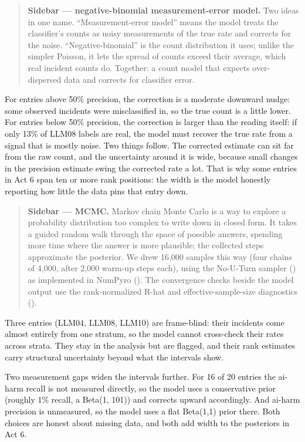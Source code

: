 \documentclass[11pt]{article}
\begin{document}
\begin{quote}
\textbf{Sidebar --- negative-binomial measurement-error model.} Two
ideas in one name. ``Measurement-error model'' means the model treats
the classifier's counts as noisy measurements of the true rate and
corrects for the noise. ``Negative-binomial'' is the count distribution
it uses; unlike the simpler Poisson, it lets the spread of counts exceed
their average, which real incident counts do. Together: a count model
that expects over-dispersed data and corrects for classifier error.
\end{quote}

For entries above 50\% precision, the correction is a moderate downward
nudge: some observed incidents were misclassified in, so the true count
is a little lower. For entries below 50\% precision, the correction is
larger than the reading itself: if only 13\% of LLM08 labels are real,
the model must recover the true rate from a signal that is mostly noise.
Two things follow. The corrected estimate can sit far from the raw
count, and the uncertainty around it is wide, because small changes in
the precision estimate swing the corrected rate a lot. That is why some
entries in Act 6 span ten or more rank positions: the width is the model
honestly reporting how little the data pins that entry down.

\begin{quote}
\textbf{Sidebar --- MCMC.} Markov chain Monte Carlo is a way to explore
a probability distribution too complex to write down in closed form. It
takes a guided random walk through the space of possible answers,
spending more time where the answer is more plausible; the collected
steps approximate the posterior. We drew 16,000 samples this way (four
chains of 4,000, after 2,000 warm-up steps each), using the No-U-Turn
sampler () as
implemented in NumPyro (). The
convergence checks beside the model output use the rank-normalized R-hat
and effective-sample-size diagnostics
().
\end{quote}

Three entries (LLM04, LLM08, LLM10) are frame-blind: their incidents
come almost entirely from one stratum, so the model cannot cross-check
their rates across strata. They stay in the analysis but are flagged,
and their rank estimates carry structural uncertainty beyond what the
intervals show.

Two measurement gaps widen the intervals further. For 16 of 20 entries
the ai-harm recall is not measured directly, so the model uses a
conservative prior (roughly 1\% recall, a Beta(1, 101)) and corrects
upward accordingly. And ai-harm precision is unmeasured, so the model
uses a flat Beta(1,1) prior there. Both choices are honest about missing
data, and both add width to the posteriors in Act 6.
\end{document}
